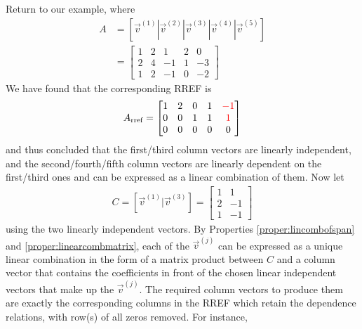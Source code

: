 Return to our example, where
\begin{align*}
A &= [\vec{v}^{(1)}|\vec{v}^{(2)}|\vec{v}^{(3)}|\vec{v}^{(4)}|\vec{v}^{(5)}] \\
&= 
\begin{bmatrix}
1 & 2 & 1 & 2 & 0 \\
2 & 4 & -1 & 1 & -3\\
1 & 2 & -1 & 0 & -2
\end{bmatrix}
\end{align*}
We have found that the corresponding RREF is
\begin{align*}
A_{\text{rref}} =
\begin{bmatrix}
1 & 2 & 0 & 1 & \textcolor{red}{-1} \\
0 & 0 & 1 & 1 & \textcolor{red}{1} \\
0 & 0 & 0 & 0 & 0
\end{bmatrix}
\end{align*}
and thus concluded that the first/third column vectors are linearly independent, and the second/fourth/fifth column vectors are linearly dependent on the first/third ones and can be expressed as a linear combination of them. Now let
\begin{align*}
C = [\vec{v}^{(1)}|\vec{v}^{(3)}] = \begin{bmatrix}
1 & 1 \\
2 & -1 \\
1 & -1
\end{bmatrix}
\end{align*}
using the two linearly independent vectors. By Properties \ref{proper:lincombofspan} and \ref{proper:linearcombmatrix}, each of the $\vec{v}^{(j)}$ can be expressed as a unique linear combination in the form of a matrix product between $C$ and a column vector that contains the coefficients in front of the chosen linear independent vectors that make up the $\vec{v}^{(j)}$. The required column vectors to produce them are exactly the corresponding columns in the RREF which retain the dependence relations, with row(s) of all zeros removed. For instance,
